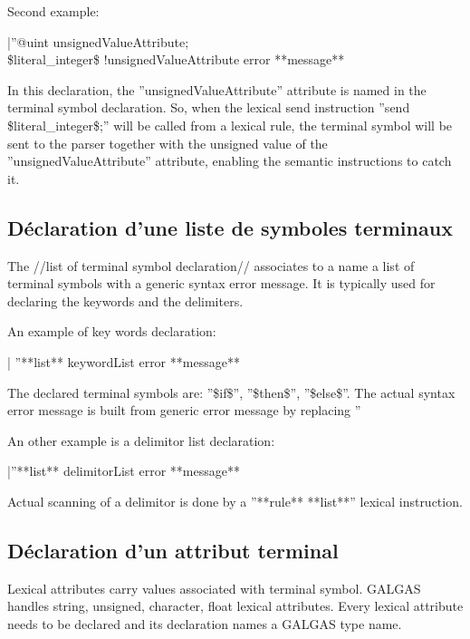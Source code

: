 Second example:

|''@uint unsignedValueAttribute;\\
\$literal\_integer\$ !unsignedValueAttribute error **message** %

In this declaration, the ''unsignedValueAttribute'' attribute is named in the terminal symbol declaration. So, when the lexical send instruction ''send \$literal\_integer\$;'' will be called from a lexical rule, the terminal symbol will be sent to the parser together with the unsigned value of the ''unsignedValueAttribute'' attribute, enabling the semantic instructions to catch it.

\subsection{Déclaration d'une liste de symboles terminaux}

The //list of terminal symbol declaration// associates to a name a list of terminal symbols with a generic syntax error message. It is typically used for declaring the keywords and the delimiters.

An example of key words declaration:

| ''**list** keywordList error **message** %

The declared terminal symbols are: ''\$if\$'', ''\$then\$'', ''\$else\$''. The actual syntax error message is built from generic error message by replacing ''%

An other example is a delimitor list declaration:

|''**list** delimitorList error **message** %

Actual scanning of a delimitor is done by a ''**rule** **list**'' lexical instruction.

\subsection{Déclaration d'un attribut terminal}

Lexical attributes carry values associated with terminal symbol. GALGAS handles string, unsigned, character, float lexical attributes. Every lexical attribute needs to be declared and its declaration names a GALGAS type name.



